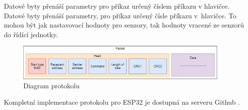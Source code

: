 Datové byty přenáší parametry pro příkaz určený číslem příkazu v hlavičce.
Datové byty přenáší parametry, pro příkaz určený čísle příkazu v~hlavičce.
To mohou být jak nastavovací hodnoty pro senzory, tak hodnoty vracené ze senzorů do řídící jednotky.

\begin{figure}[h]
    \begin{small}
        \begin{center}
            \includegraphics[width=400px]{img/Protocol_diagram.png}
        \end{center}
        \caption{Diagram protokolu}
        \label{fig: Diagram protokolu}
    \end{small}
\end{figure}


Kompletní implementace protokolu pro ESP32 je dostupná na serveru Github \cite{protocol}. 


